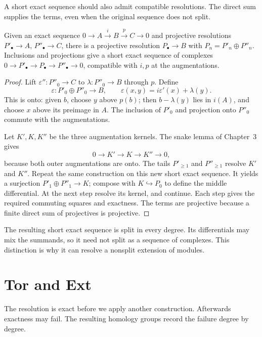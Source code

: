 A short exact sequence should also admit compatible resolutions. The direct sum supplies the terms, even when the original sequence does not split.

\begin{lemma}\label{lem:horseshoe}
Given an exact sequence $0\to A\xrightarrow{i}B\xrightarrow{p}C\to0$ and projective resolutions $P'_\bullet\to A$, $P''_\bullet\to C$, there is a projective resolution $P_\bullet\to B$ with
$P_n=P'_n\oplus P''_n$. Inclusions and projections give a short exact sequence of complexes
$0\to P'_\bullet\to P_\bullet\to P''_\bullet\to0$, compatible with $i,p$ at the augmentations.
\end{lemma}

\begin{proof}
Lift $\varepsilon'':P''_0\to C$ to $\lambda:P''_0\to B$ through $p$. Define
\[
\varepsilon:P'_0\oplus P''_0\longrightarrow B,
\qquad \varepsilon(x,y)=i\varepsilon'(x)+\lambda(y).
\]
This is onto: given $b$, choose $y$ above $p(b)$; then $b-\lambda(y)$ lies in $i(A)$, and choose $x$ above its preimage in $A$. The inclusion of $P'_0$ and projection onto $P''_0$ commute with the augmentations.

Let $K',K,K''$ be the three augmentation kernels. The snake lemma of Chapter~3 gives
\[
0\longrightarrow K'\longrightarrow K\longrightarrow K''\longrightarrow0,
\]
because both outer augmentations are onto. The tails $P'_{\ge1}$ and $P''_{\ge1}$ resolve $K'$ and $K''$. Repeat the same construction on this new short exact sequence. It yields a surjection $P'_1\oplus P''_1\to K$; compose with $K\hookrightarrow P_0$ to define the middle differential. At the next step resolve its kernel, and continue. Each step gives the required commuting squares and exactness. The terms are projective because a finite direct sum of projectives is projective.
\end{proof}

The resulting short exact sequence is split in every degree. Its differentials may mix the summands, so it need not split as a sequence of complexes. This distinction is why it can resolve a nonsplit extension of modules.

\section{Tor and Ext}

The resolution is exact before we apply another construction. Afterwards exactness may fail. The resulting homology groups record the failure degree by degree.

